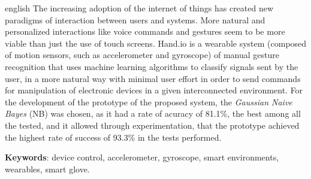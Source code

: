 \documentclass[
	12pt,				%
    oneside,
	a4paper,			%
	chapter=TITLE,		%
	english,			%
	brazil				%
	]{abntex2}
\begin{document}
\setlength{\absparsep}{18pt}
\begin{resumo}[Abstract]
\begin{otherlanguage*}{english}
    The increasing adoption of the internet of things has created new paradigms of interaction between users and systems. More natural and personalized interactions like voice commands and gestures seem to be more viable than just the use of touch screens. Hand.io is a wearable system (composed of motion sensors, such as accelerometer and gyroscope) of manual gesture recognition that uses machine learning algorithms to classify signals sent by the user, in a more natural way with minimal user effort in order to send commands for manipulation of electronic devices in a given interconnected environment. For the development of the prototype of the proposed system, the \textit{Gaussian Naive Bayes} (NB) was chosen, as it had a rate of acuracy of 81.1\%, the best among all the tested, and it allowed through experimentation, that the prototype achieved the highest rate of success of 93.3\% in the tests performed.
    \vspace{\onelineskip}
 
    \noindent 
    \textbf{Keywords}: device control, accelerometer, gyroscope, smart environments, wearables, smart glove.
\end{otherlanguage*}
\end{resumo}

\renewcommand{\listfigurename}{Lista de Figuras}
\listoffigures*
\cleardoublepage

\renewcommand{\listtablename}{Lista de Tabelas}
\listoftables*
\cleardoublepage


\end{document}
